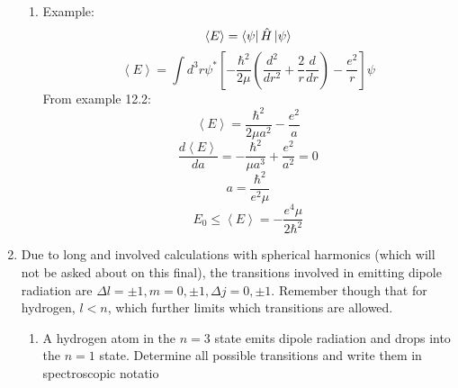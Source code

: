 \documentclass[english]{article}
\begin{document}
\begin{enumerate}
\begin{enumerate}
\item Example:
$$\left\langle E\right\rangle=\bra{\psi}\hat{H}\ket{\psi}$$
$$\left\langle E\right\rangle=\int d^3r\psi^*\left[-\frac{\hbar^2}{2\mu}\left(\frac{d^2}{dr^2}+\frac{2}{r}\frac{d}{dr}\right)-\frac{e^2}{r}\right]\psi$$
From example 12.2:
$$\left\langle E\right\rangle=\frac{\hbar^2}{2\mu a^2}-\frac{e^2}{a}$$
$$\frac{d\left\langle E\right\rangle}{da}=-\frac{\hbar^2}{\mu a^3}+\frac{e^2}{a^2}=0$$
$$a=\frac{\hbar^2}{e^2\mu}$$
$$E_0\leq\left\langle E\right\rangle=-\frac{e^4\mu}{2\hbar^2}$$
\end{enumerate}
\item  Due to long and involved calculations with spherical harmonics (which will not be asked about on this final), the transitions involved in emitting dipole radiation are $\Delta l=\pm 1,m=0,\pm 1,\Delta j=0,\pm 1$. Remember though that for hydrogen, $l < n$, which further limits which transitions are allowed.\begin{enumerate}
\item 
A hydrogen atom in the $n = 3$ state emits dipole radiation and drops into the $n = 1$ state. Determine all possible transitions and write them in spectroscopic notatio


\end{enumerate}
\end{enumerate}
\end{document}
